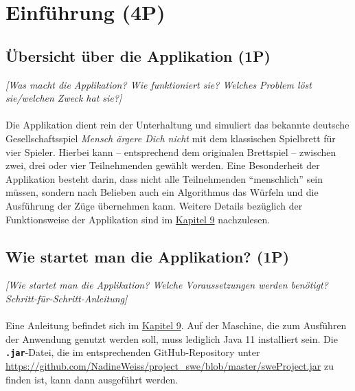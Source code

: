 
\titlespacing*{\chapter}{0pt}{-30mm}{10pt}
  
\chapter{Einführung (4P)}
\pagestyle{scrheadings}
\clearscrheadfoot
{}
\setcounter{page}{1}
\ofoot[\pagemark]{\pagemark}
\onehalfspacing

\section{Übersicht über die Applikation (1P)}
\emph{[Was macht die Applikation? Wie funktioniert sie? Welches Problem löst sie/welchen Zweck hat sie?]}
\\
\\
\noindent Die Applikation dient rein der Unterhaltung und simuliert das bekannte deutsche Gesell\-schaftsspiel \emph{Mensch ärgere Dich nicht} mit dem klassischen Spielbrett für vier Spieler. Hierbei kann -- entsprechend dem originalen Brettspiel -- zwischen zwei, drei oder vier Teilnehmenden gewählt werden. Eine Besonderheit der Applikation besteht darin, dass nicht alle Teilnehmenden \enquote{menschlich} sein müssen, sondern nach Belieben auch ein Algorithmus das Würfeln und die Ausführung der Züge übernehmen kann. Weitere Details bezüglich der Funktionsweise der Applikation sind im \hyperref[ch:anleitung]{Kapitel 9} nachzulesen. %

\section{Wie startet man die Applikation? (1P)}
\emph{[Wie startet man die Applikation? Welche Voraussetzungen werden benötigt? Schritt-für-Schritt-Anleitung]}
\\
\\
\noindent Eine Anleitung befindet sich im \hyperref[ch:anleitung]{Kapitel 9}. Auf der Maschine, die zum Ausführen der Anwendung genutzt werden soll, muss lediglich Java 11 installiert sein. Die \textbf{\texttt{.jar}}-Datei, die im entsprechenden GitHub-Repository unter \url{https://github.com/NadineWeiss/project_swe/blob/master/sweProject.jar} zu finden ist, kann dann ausgeführt werden.

